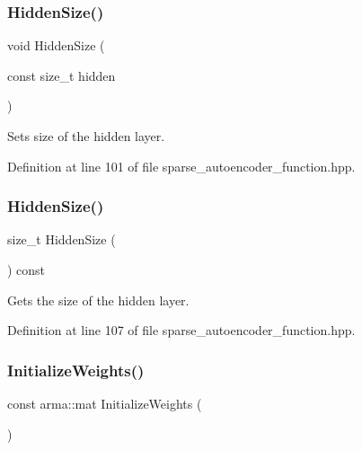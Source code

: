 \subsubsection{Hidden\+Size()\hspace{0.1cm}{\footnotesize\ttfamily [1/2]}}
{\footnotesize\ttfamily void Hidden\+Size (\begin{DoxyParamCaption}\item[{const size\+\_\+t}]{hidden }\end{DoxyParamCaption})\hspace{0.3cm}{\ttfamily [inline]}}



Sets size of the hidden layer. 



Definition at line 101 of file sparse\+\_\+autoencoder\+\_\+function.\+hpp.

\mbox{\label{classmlpack_1_1nn_1_1SparseAutoencoderFunction_a820e775a98d21ef0d06283a445e0813a}} 
\subsubsection{Hidden\+Size()\hspace{0.1cm}{\footnotesize\ttfamily [2/2]}}
{\footnotesize\ttfamily size\+\_\+t Hidden\+Size (\begin{DoxyParamCaption}{ }\end{DoxyParamCaption}) const\hspace{0.3cm}{\ttfamily [inline]}}



Gets the size of the hidden layer. 



Definition at line 107 of file sparse\+\_\+autoencoder\+\_\+function.\+hpp.

\mbox{\label{classmlpack_1_1nn_1_1SparseAutoencoderFunction_a97fbb8f95277b263fbb07eda614633ea}} 
\subsubsection{Initialize\+Weights()}
{\footnotesize\ttfamily const arma\+::mat Initialize\+Weights (\begin{DoxyParamCaption}{ }\end{DoxyParamCaption})}




